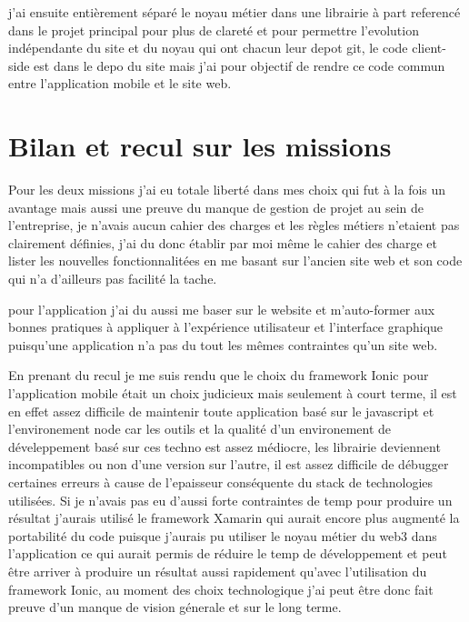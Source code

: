 j'ai ensuite entièrement séparé le noyau métier dans une librairie à part referencé dans 
le projet principal pour plus de clareté et pour permettre l'evolution indépendante du site 
et du noyau qui ont chacun leur depot git, le code client-side est dans le depo du site 
mais j'ai pour objectif de rendre ce code commun entre l'application mobile et le site web.

\section{Bilan et recul sur les missions}
Pour les deux missions j'ai eu totale liberté dans mes choix qui fut à la fois un avantage mais 
aussi une preuve du manque de gestion de projet au sein de l'entreprise, je n'avais 
aucun cahier des charges et les règles métiers n'etaient pas clairement définies,
j'ai du donc établir par moi même le cahier des charge et lister les nouvelles fonctionnalitées 
en me basant sur l'ancien site web et son code qui n'a d'ailleurs pas facilité la tache. \newline

pour l'application j'ai du aussi me baser sur le website et m'auto-former aux bonnes pratiques 
à appliquer à l'expérience utilisateur et l'interface graphique puisqu'une application
n'a pas du tout les mêmes contraintes qu'un site web. \newline

En prenant du recul je me suis rendu que le choix du framework Ionic pour l'application mobile
était un choix judicieux mais seulement à court terme, il est en effet assez difficile de maintenir toute 
application basé sur le javascript et l'environement node car les outils et la qualité 
d'un environement de déveleppement basé sur ces techno est assez médiocre, les librairie 
deviennent incompatibles ou non d'une version sur l'autre, il est assez difficile 
de débugger certaines erreurs à cause de l'epaisseur conséquente du stack de technologies
utilisées. Si je n'avais pas eu d'aussi forte contraintes de temp pour produire un résultat 
j'aurais utilisé le framework Xamarin qui aurait encore plus augmenté la portabilité 
du code puisque j'aurais pu utiliser le noyau métier du web3 dans l'application
ce qui aurait permis de réduire le temp de développement et peut être arriver 
à produire un résultat aussi rapidement qu'avec l'utilisation du framework Ionic, 
au moment des choix technologique j'ai peut être donc fait preuve d'un manque de vision génerale
et sur le long terme. \newline


